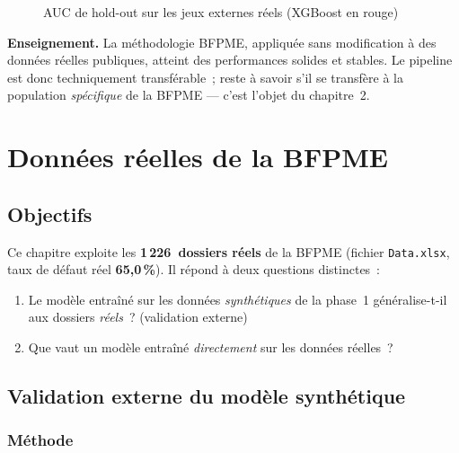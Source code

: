 \documentclass[a4paper,11pt]{report}
\newcommand{\aucbar}[4]{%
  \node[anchor=east, font=\small] at (0,#1) {#2};
  \draw[fill=LightGray, draw=MidGray] (0.2,{#1-0.2}) rectangle (6.2,{#1+0.2});
  \draw[fill=#4, draw=#4] (0.2,{#1-0.2}) rectangle ({0.2+6.0*#3},{#1+0.2});
  \node[anchor=west, font=\small\bfseries] at (6.35,#1) {#3};
}
\begin{document}
\begin{figure}[H]
\centering
{}
\caption{AUC de hold-out sur les jeux externes réels (XGBoost en rouge)}
\label{fig:externes}
\end{figure}

\noindent\textbf{Enseignement.} La méthodologie BFPME, appliquée sans modification à des données
réelles publiques, atteint des performances solides et stables. Le pipeline est donc
techniquement transférable~; reste à savoir s'il se transfère à la population \emph{spécifique}
de la BFPME — c'est l'objet du chapitre~2.

\chapter{Données réelles de la BFPME}

\section{Objectifs}

Ce chapitre exploite les \textbf{1\,226~dossiers réels} de la BFPME (fichier \texttt{Data.xlsx},
taux de défaut réel \textbf{65,0\,\%}). Il répond à deux questions distinctes~:
\begin{enumerate}[leftmargin=1.8em]
  \item Le modèle entraîné sur les données \emph{synthétiques} de la phase~1 généralise-t-il aux
        dossiers \emph{réels}~? (validation externe)
  \item Que vaut un modèle entraîné \emph{directement} sur les données réelles~?
\end{enumerate}

\section{Validation externe du modèle synthétique}

\subsection{Méthode}
\end{document}
